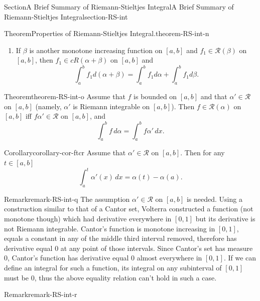 \documentclass[oneside,10pt,]{article}
\numberwithin{equation}{section}
\newcommand{\cR}{\mathcal{R}}
\begin{document}
\begin{sectionptx}{Section}{A Brief Summary of Riemann-Stieltjes Integral}{}{A Brief Summary of Riemann-Stieltjes Integral}{}{}{section-RS-int}
\begin{theorem}{Theorem}{Properties of Riemann-Stieltjes Integral.}{}{theorem-RS-int-n}
\begin{enumerate}[label=(\alph*)]
\begin{equation*}
\left|  \int_{a}^{b} f_{1} d\alpha \right|\le M[\alpha(b)-\alpha(b)].
\end{equation*}
%
\item{}If \(\beta\) is another monotone increasing function on \([a, b]\) and \(f_{1} \in \cR(\beta)\) on \([a, b]\), then \(f_{1} \in cR(\alpha +\beta)\) on \([a, b]\) and%
\begin{equation*}
\int_{a}^{b} f_{1} d(\alpha+\beta) = \int_{a}^{b} f_{1} d\alpha + \int_{a}^{b} f_{1} d\beta.
\end{equation*}
%
\end{enumerate}
\end{theorem}
\begin{theorem}{Theorem}{}{}{theorem-RS-int-o}%
Assume that \(f\) is bounded on \([a, b]\) and that \(\alpha' \in \cR\) on \([a, b]\) (namely, \(\alpha'\) is Riemann integrable on \([a, b]\)). Then \(f\in \cR(\alpha)\) on \([a, b]\) iff \(f\alpha' \in \cR\) on \([a, b]\), and%
\begin{equation}
\int_{a}^{b} f\, d\alpha = \int_{a}^{b} f \alpha'\, dx.\label{men-int-rseval}
\end{equation}
\end{theorem}
\begin{corollary}{Corollary}{}{}{corollary-cor-ftcr}%
Assume that \(\alpha' \in \cR\) on \([a, b]\). Then for any \(t\in [a, b]\)%
\begin{equation}
\int_{a}^{t} \alpha'(x)\, dx = \alpha(t)-\alpha(a).\label{men-eq-ftcr}
\end{equation}
\end{corollary}
\begin{remark}{Remark}{}{remark-RS-int-q}%
The assumption \(\alpha' \in \cR\) on \([a, b]\) is needed. Using a construction similar to that of a Cantor set, Volterra constructed a function (not monotone though) which had derivative everywhere in \([0, 1]\) but its derivative is not Riemann integrable. Cantor's function is monotone increasing in \([0, 1]\), equals a constant in any of the middle third interval removed, therefore has derivative equal \(0\) at any point of those intervals. Since Cantor's set has measure \(0\), Cantor's function has derivative equal \(0\) almost everywhere in \([0, 1]\). If we can define an integral for such a function, its integral on any subinterval of \([0, 1]\) must be \(0\), thus the above equality relation can't hold in such a case.%
\end{remark}
\begin{remark}{Remark}{}{remark-RS-int-r}%

\end{remark}
\end{sectionptx}
\end{document}

